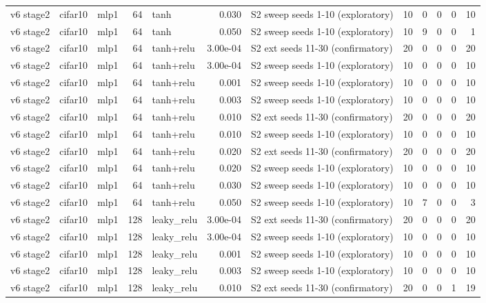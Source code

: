 \begin{table}[htbp]
{\begin{tabular}{@{}lllrlrlrrrrr@{}}
v6 stage2 & cifar10 & mlp1 & 64 & tanh & 0.030 & S2 sweep seeds 1-10 (exploratory) & 10 & 0 & 0 & 0 & 10 \\
v6 stage2 & cifar10 & mlp1 & 64 & tanh & 0.050 & S2 sweep seeds 1-10 (exploratory) & 10 & 9 & 0 & 0 & 1 \\
v6 stage2 & cifar10 & mlp1 & 64 & tanh+relu & 3.00e-04 & S2 ext seeds 11-30 (confirmatory) & 20 & 0 & 0 & 0 & 20 \\
v6 stage2 & cifar10 & mlp1 & 64 & tanh+relu & 3.00e-04 & S2 sweep seeds 1-10 (exploratory) & 10 & 0 & 0 & 0 & 10 \\
v6 stage2 & cifar10 & mlp1 & 64 & tanh+relu & 0.001 & S2 sweep seeds 1-10 (exploratory) & 10 & 0 & 0 & 0 & 10 \\
v6 stage2 & cifar10 & mlp1 & 64 & tanh+relu & 0.003 & S2 sweep seeds 1-10 (exploratory) & 10 & 0 & 0 & 0 & 10 \\
v6 stage2 & cifar10 & mlp1 & 64 & tanh+relu & 0.010 & S2 ext seeds 11-30 (confirmatory) & 20 & 0 & 0 & 0 & 20 \\
v6 stage2 & cifar10 & mlp1 & 64 & tanh+relu & 0.010 & S2 sweep seeds 1-10 (exploratory) & 10 & 0 & 0 & 0 & 10 \\
v6 stage2 & cifar10 & mlp1 & 64 & tanh+relu & 0.020 & S2 ext seeds 11-30 (confirmatory) & 20 & 0 & 0 & 0 & 20 \\
v6 stage2 & cifar10 & mlp1 & 64 & tanh+relu & 0.020 & S2 sweep seeds 1-10 (exploratory) & 10 & 0 & 0 & 0 & 10 \\
v6 stage2 & cifar10 & mlp1 & 64 & tanh+relu & 0.030 & S2 sweep seeds 1-10 (exploratory) & 10 & 0 & 0 & 0 & 10 \\
v6 stage2 & cifar10 & mlp1 & 64 & tanh+relu & 0.050 & S2 sweep seeds 1-10 (exploratory) & 10 & 7 & 0 & 0 & 3 \\
v6 stage2 & cifar10 & mlp1 & 128 & leaky\_relu & 3.00e-04 & S2 ext seeds 11-30 (confirmatory) & 20 & 0 & 0 & 0 & 20 \\
v6 stage2 & cifar10 & mlp1 & 128 & leaky\_relu & 3.00e-04 & S2 sweep seeds 1-10 (exploratory) & 10 & 0 & 0 & 0 & 10 \\
v6 stage2 & cifar10 & mlp1 & 128 & leaky\_relu & 0.001 & S2 sweep seeds 1-10 (exploratory) & 10 & 0 & 0 & 0 & 10 \\
v6 stage2 & cifar10 & mlp1 & 128 & leaky\_relu & 0.003 & S2 sweep seeds 1-10 (exploratory) & 10 & 0 & 0 & 0 & 10 \\
v6 stage2 & cifar10 & mlp1 & 128 & leaky\_relu & 0.010 & S2 ext seeds 11-30 (confirmatory) & 20 & 0 & 0 & 1 & 19 \\

\end{tabular}}
\end{table}

